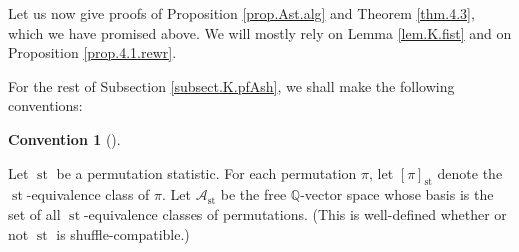 \documentclass[numbers=enddot,12pt,final,onecolumn,notitlepage]{scrartcl}%
\theoremstyle{definition}
\newtheorem{conv}[theo]{Convention}
\newenvironment{convention}[1][]
{\begin{conv}[#1]\begin{leftbar}}
{\end{leftbar}\end{conv}}
\newenvironment{convention}[1][Convention]{\noindent\textbf{#1.} }{\ \rule{0.5em}{0.5em}}
\begin{document}
Let us now give proofs of Proposition \ref{prop.Ast.alg} and Theorem
\ref{thm.4.3}, which we have promised above. We will mostly rely on Lemma
\ref{lem.K.fist} and on Proposition \ref{prop.4.1.rewr}.

For the rest of Subsection \ref{subsect.K.pfAsh}, we shall make the following conventions:

\begin{convention}
Let $\operatorname*{st}$ be a permutation statistic. For each permutation
$\pi$, let $\left[  \pi\right]  _{\operatorname*{st}}$ denote the
$\operatorname*{st}$-equivalence class of $\pi$. Let $\mathcal{A}%
_{\operatorname*{st}}$ be the free $\mathbb{Q}$-vector space whose basis is
the set of all $\operatorname*{st}$-equivalence classes of permutations. (This
is well-defined whether or not $\operatorname*{st}$ is shuffle-compatible.)
\end{convention}
\end{document}
